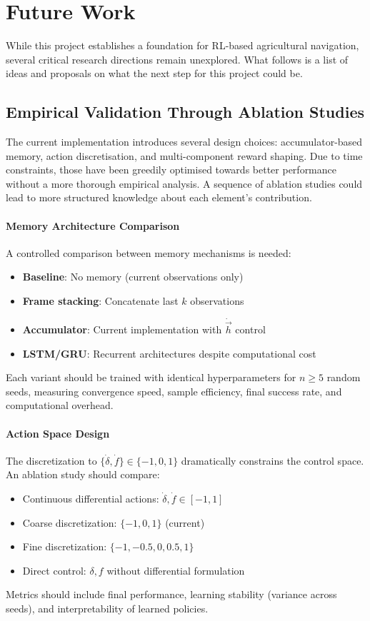 \documentclass[11pt,a4paper,twocolumn]{article}
\begin{document}
\section{Future Work}

While this project establishes a foundation for RL-based agricultural navigation, several critical research directions remain unexplored. What follows is a list of ideas and proposals on what the next step for this project could be.

\subsection{Empirical Validation Through Ablation Studies}

The current implementation introduces several design choices: accumulator-based memory, action discretisation, and multi-component reward shaping. Due to time constraints, those have been greedily optimised towards better performance without a more thorough empirical analysis. A sequence of ablation studies could lead to more structured knowledge about each element's contribution. 

\paragraph{Memory Architecture Comparison}
A controlled comparison between memory mechanisms is needed:
\begin{itemize}
    \item \textbf{Baseline}: No memory (current observations only)
    \item \textbf{Frame stacking}: Concatenate last $k$ observations
    \item \textbf{Accumulator}: Current implementation with $\dot{\vec{h}}$ control
    \item \textbf{LSTM/GRU}: Recurrent architectures despite computational cost
\end{itemize}
Each variant should be trained with identical hyperparameters for $n \geq 5$ random seeds, measuring convergence speed, sample efficiency, final success rate, and computational overhead.

\paragraph{Action Space Design}
The discretization to $\{\dot{\delta}, \dot{f}\} \in \{-1, 0, 1\}$ dramatically constrains the control space. An ablation study should compare:
\begin{itemize}
    \item Continuous differential actions: $\dot{\delta}, \dot{f} \in [-1, 1]$
    \item Coarse discretization: $\{-1, 0, 1\}$ (current)
    \item Fine discretization: $\{-1, -0.5, 0, 0.5, 1\}$
    \item Direct control: $\delta, f$ without differential formulation
\end{itemize}
Metrics should include final performance, learning stability (variance across seeds), and interpretability of learned policies.
\end{document}
